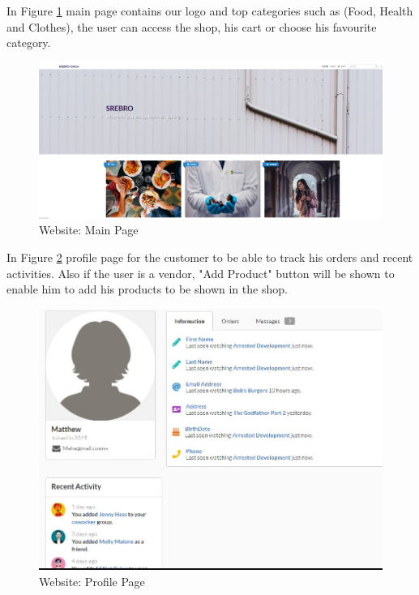 In Figure \ref{fig: main Page} main page contains our logo and top categories such as (Food, Health and Clothes), the user can access the shop, his cart or choose his favourite category.\newline \newline
\begin{figure}[htp]%
    \center%
    \includegraphics[width=1\textwidth]{images/Software/MainPage.PNG}%
    \caption[Website: Main Page]{Website: Main Page}\label{fig: main Page}%
  \end{figure}\newline \newline
 
In Figure \ref{fig: profile} profile page for the customer to be able to track his orders and recent activities. Also if the user is a vendor, "Add Product" button will be shown to enable him to add his products to be shown in the shop.
\begin{figure}[htp]%
    \center%
    \includegraphics[width=1\textwidth]{images/Software/profile.jpeg}%
    \caption[Website: Profile Page]{Website: Profile Page}\label{fig: profile}%
  \end{figure}\newpage
  
